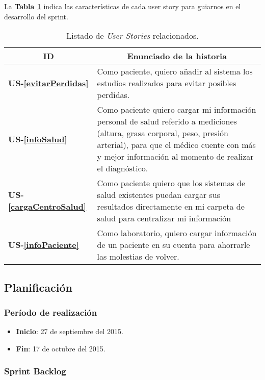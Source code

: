 La \textbf{Tabla \ref{US-Sprint6}} indica las características de cada user story para guiarnos en el desarrollo del sprint.

\begin{table}[h]
	\centering
	\begin{tabular}{|m{2cm}|m{11cm}|}
		\hline
		\multicolumn{1}{|c|}{\textbf{ID}} &
		\multicolumn{1}{c|}{\textbf{Enunciado de la historia}} \\          
		\hline
		\textbf{US-\ref{evitarPerdidas} } & Como paciente, quiero añadir al sistema los estudios realizados para evitar posibles perdidas.\\
		\hline
		\textbf{US-\ref{infoSalud}} & Como paciente quiero cargar mi información personal de salud referido a mediciones (altura, grasa corporal, peso, presión arterial), para que el médico cuente con más y mejor información al momento de realizar el diagnóstico.\\
		\hline
		\textbf{US- \ref{cargaCentroSalud}} & Como paciente quiero que los sistemas de salud existentes puedan cargar sus resultados directamente en mi carpeta de salud para centralizar mi
		información\\
		\hline
		\textbf{US-\ref{infoPaciente}} &Como laboratorio, quiero cargar información de un paciente en su cuenta para ahorrarle las molestias de volver.\\
		\hline
	\end{tabular}
	\caption{Listado de \textit{User Stories} relacionados.}
	\label{US-Sprint6}
\end{table}


\subsection{Planificación}

\subsubsection{Período de realización}
\begin{itemize}
    \item \textbf{Inicio}: 27 de septiembre del 2015.
    \item \textbf{Fin}: 17 de octubre del 2015.
\end{itemize}

\subsubsection{Sprint Backlog}


